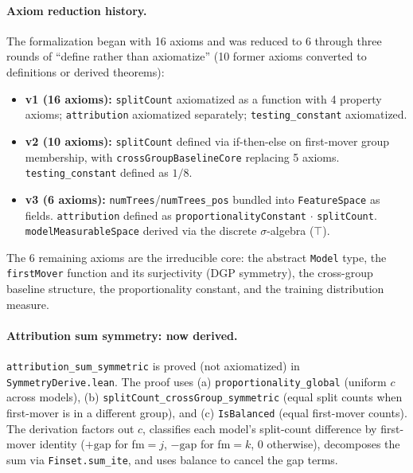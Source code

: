 \documentclass{article}
\begin{document}
\paragraph{Axiom reduction history.}
The formalization began with 16 axioms and was reduced to 6 through three rounds of ``define rather than axiomatize'' (10 former axioms converted to definitions or derived theorems):
\begin{itemize}
\item \textbf{v1 (16 axioms):} \texttt{splitCount} axiomatized as a function with 4 property axioms; \texttt{attribution} axiomatized separately; \texttt{testing\_constant} axiomatized.
\item \textbf{v2 (10 axioms):} \texttt{splitCount} defined via if-then-else on first-mover group membership, with \texttt{crossGroupBaselineCore} replacing 5 axioms. \texttt{testing\_constant} defined as $1/8$.
\item \textbf{v3 (6 axioms):} \texttt{numTrees}/\texttt{numTrees\_pos} bundled into \texttt{FeatureSpace} as fields. \texttt{attribution} defined as \texttt{proportionalityConstant} $\cdot$ \texttt{splitCount}. \texttt{modelMeasurableSpace} derived via the discrete $\sigma$-algebra ($\top$).
\end{itemize}
The 6 remaining axioms are the irreducible core: the abstract \texttt{Model} type, the \texttt{firstMover} function and its surjectivity (DGP symmetry), the cross-group baseline structure, the proportionality constant, and the training distribution measure.

\paragraph{Attribution sum symmetry: now derived.}
\texttt{attribution\_sum\_symmetric} is proved (not axiomatized) in \texttt{SymmetryDerive.lean}. The proof uses (a) \texttt{proportionality\_global} (uniform $c$ across models), (b) \texttt{splitCount\_crossGroup\_symmetric} (equal split counts when first-mover is in a different group), and (c) \texttt{IsBalanced} (equal first-mover counts). The derivation factors out $c$, classifies each model's split-count difference by first-mover identity ($+\text{gap}$ for fm$=j$, $-\text{gap}$ for fm$=k$, $0$ otherwise), decomposes the sum via \texttt{Finset.sum\_ite}, and uses balance to cancel the gap terms.
\end{document}
